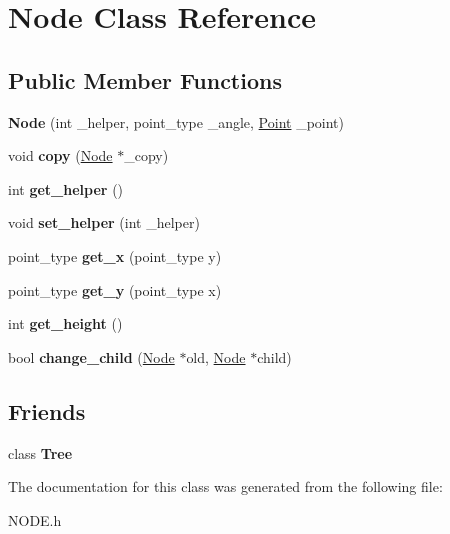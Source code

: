 \hypertarget{class_node}{}\section{Node Class Reference}
\label{class_node}
\subsection*{Public Member Functions}
\begin{DoxyCompactItemize}
\item 
\mbox{\label{class_node_a6d4c1af16a186b0c0a96d490f76fb520}} 
{\bfseries Node} (int \+\_\+helper, point\+\_\+type \+\_\+angle, \mbox{\hyperlink{class_point}{Point}} \+\_\+point)
\item 
\mbox{\label{class_node_a6819cbc306fc92d31712e217196c33f0}} 
void {\bfseries copy} (\mbox{\hyperlink{class_node}{Node}} $\ast$\+\_\+copy)
\item 
\mbox{\label{class_node_a640b2828fe9233d4e740c1a54f7cb1d7}} 
int {\bfseries get\+\_\+helper} ()
\item 
\mbox{\label{class_node_ad1d886f50631e753a6d9f1389e45e4c0}} 
void {\bfseries set\+\_\+helper} (int \+\_\+helper)
\item 
\mbox{\label{class_node_a77de4efae10f80ff64e3675ce9534ce4}} 
point\+\_\+type {\bfseries get\+\_\+x} (point\+\_\+type y)
\item 
\mbox{\label{class_node_ab9b0ea63be834a2f6e372402530c7263}} 
point\+\_\+type {\bfseries get\+\_\+y} (point\+\_\+type x)
\item 
\mbox{\label{class_node_a59299500576de3bb2a98acdc029550c9}} 
int {\bfseries get\+\_\+height} ()
\item 
\mbox{\label{class_node_a9ea4ed2092b8e56625e555fffa1d6010}} 
bool {\bfseries change\+\_\+child} (\mbox{\hyperlink{class_node}{Node}} $\ast$old, \mbox{\hyperlink{class_node}{Node}} $\ast$child)
\end{DoxyCompactItemize}
\subsection*{Friends}
\begin{DoxyCompactItemize}
\item 
\mbox{\label{class_node_a4b682814d14447120dd184fd300deade}} 
class {\bfseries Tree}
\end{DoxyCompactItemize}


The documentation for this class was generated from the following file\+:\begin{DoxyCompactItemize}
\item 
N\+O\+D\+E.\+h\end{DoxyCompactItemize}
